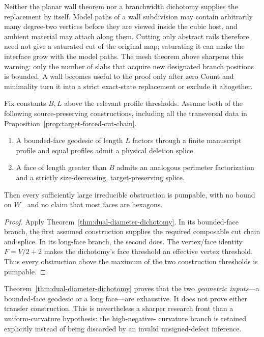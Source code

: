Neither the planar wall theorem nor a branchwidth dichotomy supplies the
replacement by itself.  Model paths of a wall subdivision may contain
arbitrarily many degree-two vertices before they are viewed inside the cubic
host, and ambient material may attach along them.  Cutting only abstract
rails therefore need not give a saturated cut of the original map; saturating
it can make the interface grow with the model paths.  The mesh theorem above
sharpens this warning: only the number of slabs that acquire new designated
branch positions is bounded.  A wall becomes useful to the proof only after
zero Count and minimality turn it into a strict exact-state replacement or
exclude it altogether.

\begin{proposition}
\label{prop:global-corridor-alternative}
Fix constants $B,L$ above the relevant profile thresholds.  Assume both of
the following source-preserving constructions, including all the transversal
data in Proposition~\ref{prop:target-forced-cut-chain}.
\begin{enumerate}
\item A bounded-face geodesic of length $L$ factors through a finite
  manuscript profile and equal profiles admit a physical deletion splice.
\item A face of length greater than $B$ admits an analogous perimeter
  factorization and a strictly size-decreasing, target-preserving splice.
\end{enumerate}
Then every sufficiently large irreducible obstruction is pumpable, with no
bound on $W_-$ and no claim that most faces are hexagons.
\end{proposition}

\begin{proof}
Apply Theorem~\ref{thm:dual-diameter-dichotomy}.  In its bounded-face branch,
the first assumed construction supplies the required composable cut chain and
splice.  In its long-face branch, the second does.  The vertex/face identity
$F=V/2+2$ makes the dichotomy's face threshold an effective vertex threshold.
Thus every obstruction above the maximum of the two construction thresholds
is pumpable.
\end{proof}

Theorem~\ref{thm:dual-diameter-dichotomy} proves that the two \emph{geometric
inputs}---a bounded-face geodesic or a long face---are exhaustive.  It does
not prove either transfer construction.  This is nevertheless a sharper
research front than a uniform-curvature hypothesis: the high-negative-
curvature branch is retained explicitly instead of being discarded by an
invalid unsigned-defect inference.

